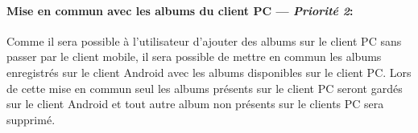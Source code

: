 \paragraph{Mise en commun avec les albums du client PC ---  \textit{Priorité 2}:} 
Comme il sera possible à l'utilisateur d'ajouter des albums sur le client PC sans passer par le client mobile, il sera possible de mettre en commun les albums enregistrés sur le client Android avec les albums disponibles sur le client PC.
Lors de cette mise en commun seul les albums présents sur le client PC seront gardés sur le client Android et tout autre album non présents sur le clients PC sera supprimé.  

